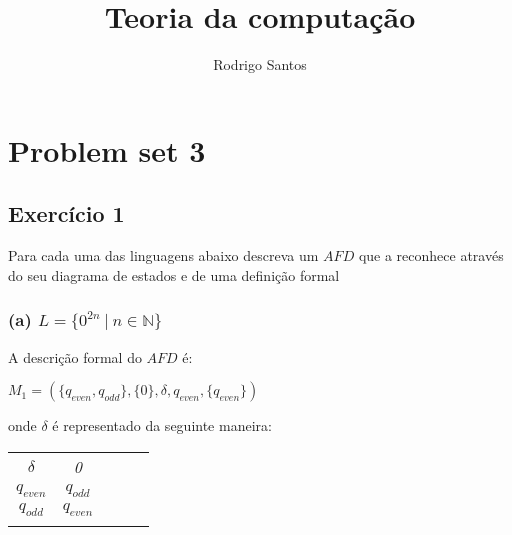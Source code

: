 \documentclass{article}
\title{Teoria da computação}
\author{Rodrigo Santos}
\begin{document}
\maketitle

\renewcommand{\thesubsection}{\arabic{subsection}}


\theoremstyle{plain}
\newtheorem{xca}{Exercise}
\theoremstyle{definition}
\newtheorem{prob}{Problem}

\section{Problem set 3}

\subsection*{Exercício 1}
Para cada uma das linguagens abaixo descreva um $AFD$ que a reconhece através do seu diagrama de estados e de uma definição formal

\subsubsection*{(a) $L = \{0^{2n} \ | \ n \in \mathbb{N}\}$}

\begin{center}
\end{center}

A descrição formal do $AFD$ é:
\begin{center}
  $M_1 = (\{q_{even},q_{odd}\}, \{0\},\delta,q_{even}, \{q_{even}\})$
\end{center}
onde $\delta$ é representado da seguinte maneira:
\begin{table}[htbp]
  \centering
  \begin{tabular}{cclll}
    \multicolumn{1}{c|}{\textit{$\delta$}}   & \textit{0}                    & \textit{} & \textit{} & \textit{} \\ \cline{1-2}
    \multicolumn{1}{c|}{\textit{$q_{even}$}} & \textit{$q_{odd}$}            & \textit{} & \textit{} & \textit{} \\
    \multicolumn{1}{c|}{\textit{$q_{odd}$}}  & \textit{$q_{even}$}           & \textit{} & \textit{} & \textit{} \\
    \multicolumn{1}{l}{\textit{}}            & \multicolumn{1}{l}{\textit{}} & \textit{} & \textit{} & \textit{}
  \end{tabular}
\end{table}
\end{document}
